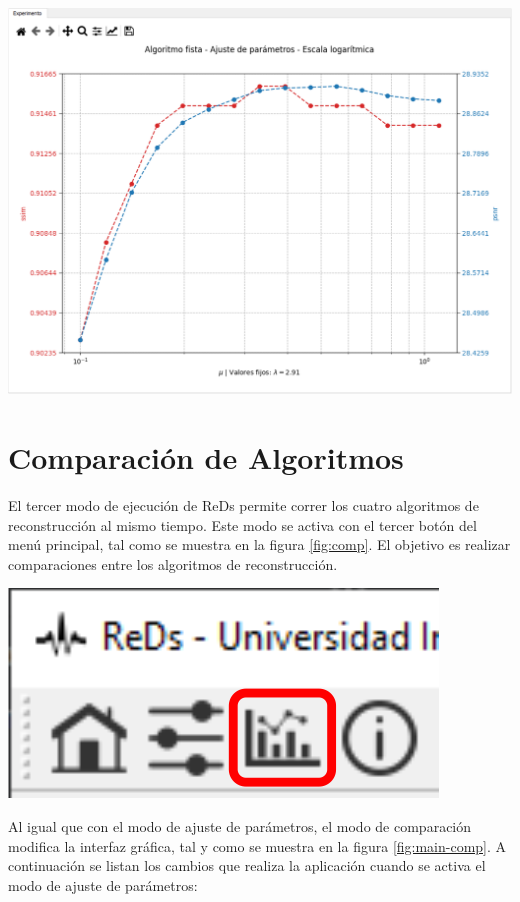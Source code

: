 \documentclass[12pt,twoside,letter]{ol-softwaremanual}
\newenvironment{Figure}
  {\par\medskip\noindent\minipage{\linewidth}}
  {\endminipage\par\medskip}
\begin{document}
\begin{Figure}
    \centering
    \includegraphics[width=1\linewidth]{tuning-2.png}
    \label{fig:tuning_2}
\end{Figure}

\section{Comparación de Algoritmos}

\begin{multicols}{2}

El tercer modo de ejecución de ReDs permite correr los cuatro algoritmos de reconstrucción al mismo tiempo. Este modo se activa con el tercer botón del menú principal, tal como se muestra en la figura \ref{fig:comp}. El objetivo es realizar comparaciones entre los algoritmos de reconstrucción.
\vfill\null
\columnbreak
\begin{Figure}
	\centering
	\includegraphics[width=0.4\linewidth]{comp-tab.png}
	\label{fig:comp}
\end{Figure}
\end{multicols}
Al igual que con el modo de ajuste de parámetros, el modo de comparación modifica la interfaz gráfica, tal y como se muestra en la figura \ref{fig:main-comp}. A continuación se listan los cambios que realiza la aplicación cuando se activa el modo de ajuste de parámetros:
\end{document}
